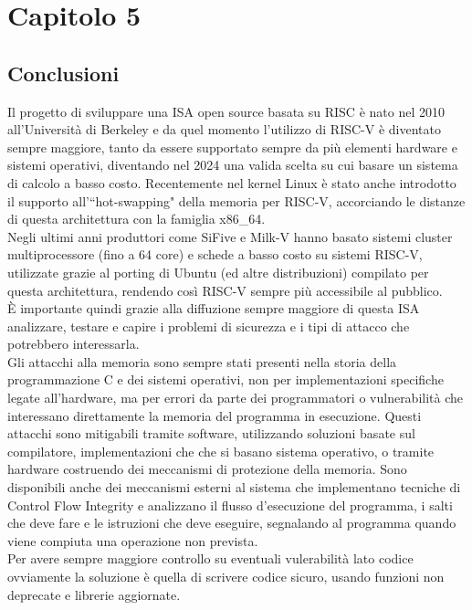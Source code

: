 \chapter*{Capitolo 5}

\section*{Conclusioni}
Il progetto di sviluppare una ISA open source basata su RISC è nato nel 2010 all'Università di Berkeley e da quel momento l'utilizzo di RISC-V è diventato sempre maggiore, tanto da essere supportato sempre da più elementi hardware e sistemi operativi, diventando nel 2024 una valida scelta su cui basare un sistema di calcolo a basso costo. Recentemente nel kernel Linux è stato anche introdotto il supporto all'``hot-swapping" \cite{hwupgrade} della memoria per RISC-V, accorciando le distanze di questa architettura con la famiglia x86\_64.\\
Negli ultimi anni produttori come SiFive e Milk-V hanno basato sistemi cluster multiprocessore (fino a 64 core) e schede a basso costo su sistemi RISC-V, utilizzate grazie al porting di Ubuntu (ed altre distribuzioni) compilato per questa architettura, rendendo così RISC-V sempre più accessibile al pubblico.\\
È importante quindi grazie alla diffuzione sempre maggiore di questa ISA analizzare, testare e capire i problemi di sicurezza e i tipi di attacco che potrebbero interessarla.\\
\newline
Gli attacchi alla memoria sono sempre stati presenti nella storia della programmazione C e dei sistemi operativi, non per implementazioni specifiche legate all'hardware, ma per errori da parte dei programmatori o vulnerabilità che interessano direttamente la memoria del programma in esecuzione. Questi attacchi sono mitigabili tramite software, utilizzando soluzioni basate sul compilatore, implementazioni che che si basano sistema operativo, o tramite hardware costruendo dei meccanismi di protezione della memoria. Sono disponibili anche dei meccanismi esterni al sistema che implementano tecniche di Control Flow Integrity e analizzano il flusso d'esecuzione del programma, i salti che deve fare e le istruzioni che deve eseguire, segnalando al programma quando viene compiuta una operazione non prevista.\\
Per avere sempre maggiore controllo su eventuali vulerabilità lato codice ovviamente la soluzione è quella di scrivere codice sicuro, usando funzioni non deprecate e librerie aggiornate.\\
